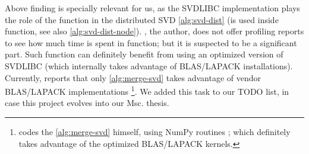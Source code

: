 Above finding is specially relevant for us, as the SVDLIBC
implementation plays the role of the  function in
the distributed SVD \cref{alg:svd-dist} (is used inside
 function, see also
\cref{alg:svd-dist-node}). \Rehurek, the author, does 
not offer profiling reports to see how much time is spent in
 function; but
it is suspected to be a significant part. Such function can definitely
benefit from using an optimized version of SVDLIBC (which internally
takes advantage of BLAS/LAPACK installations). Currently, \Rehurek
reports that only \cref{alg:merge-svd} takes advantage of vendor
BLAS/LAPACK implementations \footnote{\Rehurek codes the
  \cref{alg:merge-svd} himself, using NumPy routines \cite{numpy}; which
  definitely takes advantage of the optimized BLAS/LAPACK
  kernels.}. We added this task to our TODO list, in case this project
evolves into our Msc. thesis.
